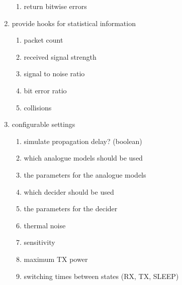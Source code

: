 \begin{enumerate}
\begin{enumerate}
			\item return bitwise errors \label{deciderBitwise}
			\end{enumerate}
 \item provide hooks for statistical information
	\begin{enumerate}
	\item packet count \label{statPackets}
	\item received signal strength \label{statRSS}
	\item signal to noise ratio \label{statSNR}
	\item bit error ratio \label{statBER}
	\item collisions \label{statColls}
	\end{enumerate}
 \item configurable settings
	\begin{enumerate}
	\item simulate propagation delay? (boolean) \label{confDelay}
	\item which analogue models should be used \label{confAnalogue}
	\item the parameters for the analogue models \label{confAnalogueParam}
	\item which decider should be used \label{confDecider}
	\item the parameters for the decider \label{confDeciderParam}
	\item thermal noise \label{confNoise}
	\item sensitivity \label{confSens}
	\item maximum TX power \label{confMaxTXPower}
	\item switching times between states (RX, TX, SLEEP) \label{confSwitchingTimes}
	\end{enumerate}
\end{enumerate}


